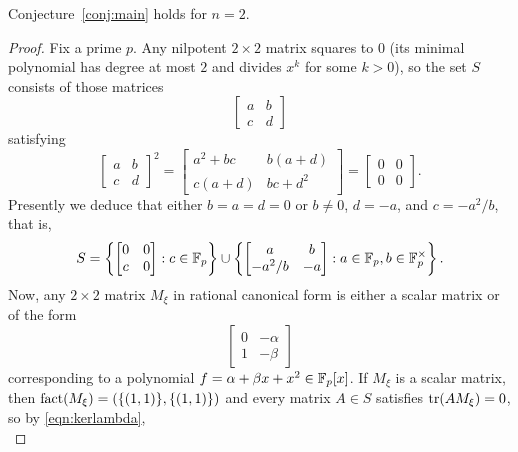 \begin{prop}
\label{prop:2by2case}
Conjecture~\ref{conj:main} holds for $n=2$.
\end{prop}
\begin{proof}
Fix a prime $p$. Any nilpotent $2\times 2$ matrix squares to $0$ (its minimal polynomial has degree at most $2$ and divides $x^k$ for some $k>0$), so the set $S$ consists of those matrices
\begin{equation*}
\begin{bmatrix}
a&b\\
c&d
\end{bmatrix}
\end{equation*}
satisfying
\begin{equation}
\label{eqn:squarezero}
\begin{bmatrix}
a&b\\
c&d
\end{bmatrix}^2
=
\begin{bmatrix}
a^2+bc&b(a+d)\\
c(a+d)&bc+d^2
\end{bmatrix}
=
\begin{bmatrix}
0&0\\
0&0
\end{bmatrix}.
\end{equation}
Presently we deduce that either $b=a=d=0$ or $b\ne 0$, $d=-a$, and $c=-a^2/b$, that is,
\begin{equation}
\label{eqn:nilptwo}
S=\left\{\begin{bmatrix}
0&0\\
c&0
\end{bmatrix}:c\in\mathbb{F}_p\right\}\cup\left\{\begin{bmatrix}
a&b\\
-a^2/b&-a
\end{bmatrix}:a\in\mathbb{F}_p,b\in\mathbb{F}_p^\times\right\}.
\end{equation}
Now, any $2\times 2$ matrix $M_\xi$ in rational canonical form is either a scalar matrix or of the form
\begin{equation}
\label{eqn:rcftwo}
\begin{bmatrix}
0&-\alpha\\
1&-\beta
\end{bmatrix}
\end{equation}
corresponding to a polynomial $f=\alpha+\beta x+x^2\in\mathbb{F}_p[x]$. If $M_\xi$ is a scalar matrix, then $\operatorname{fact}(M_\xi)=(\{(1,1)\},\{(1,1)\})$ and every matrix $A\in S$ satisfies $\operatorname{tr}(AM_\xi)=0$, so by \eqref{eqn:kerlambda},
\begin{equation*}

\end{equation*}
\end{proof}
